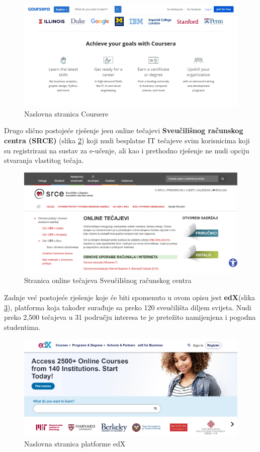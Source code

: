 	\begin{figure}[H]
		\includegraphics[scale=0.4]{slike/Coursera.PNG}
		\centering
		\caption{Naslovna stranica Coursere}
		\label{fig:Coursera}
	\end{figure}

	Drugo slično postojeće rješenje jesu online tečajevi \textbf{Sveučilišnog računskog centra (SRCE)} (slika \ref{fig:SRCE}) koji nudi besplatne IT tečajeve svim korisnicima koji su registrirani na sustav za e-učenje, ali kao i prethodno rješenje ne nudi opciju stvaranja vlastitog tečaja.
	
	\begin{figure}[H]
		\includegraphics[scale=0.4]{slike/SRCE.PNG} 
		\centering
		\caption{Stranica online tečajeva Sveučilišnog računskog centra}
		\label{fig:SRCE}
	\end{figure}  
	
	Zadnje već postojeće rješenje koje će biti spomenuto u ovom opisu jest \textbf{edX}(slika \ref{fig:edX}), platforma koja također surađuje sa preko 120 sveučilišta diljem svijeta. Nudi preko 2,500 tečajeva u 31 području interesa te je pretežito namijenjena i pogodna studentima. 
	
	\begin{figure}[H]
		\includegraphics[scale=0.4]{slike/edX.PNG} 
		\centering
		\caption{Naslovna stranica platforme edX}
		\label{fig:edX}
	\end{figure} 



		\eject
		

	